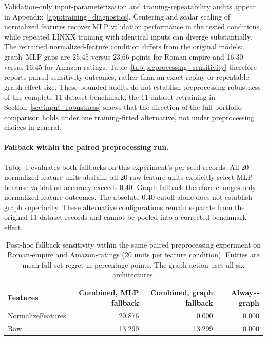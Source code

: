 Validation-only input-parameterization and training-repeatability audits appear in Appendix~\ref{app:training_diagnostics}. Centering and scalar scaling of normalized features recover MLP validation performance in the tested conditions, while repeated LINKX training with identical inputs can diverge substantially. The retrained normalized-feature condition differs from the original models: graph--MLP gaps are 25.45 versus 23.66 points for Roman-empire and 16.30 versus 16.45 for Amazon-ratings. Table~\ref{tab:preprocessing_sensitivity} therefore reports paired sensitivity outcomes, rather than an exact replay or repeatable graph effect size. These bounded audits do not establish preprocessing robustness of the complete 11-dataset benchmark; the 11-dataset retraining in Section~\ref{sec:input_robustness} shows that the direction of the full-portfolio comparison holds under one training-fitted alternative, not under preprocessing choices in general.

\paragraph{Fallback within the paired preprocessing run.}
Table~\ref{tab:preprocessing_fallback} evaluates both fallbacks on this experiment's per-seed records. All 20 normalized-feature units abstain; all 20 raw-feature units explicitly select MLP because validation accuracy exceeds 0.40. Graph fallback therefore changes only normalized-feature outcomes. The absolute 0.40 cutoff alone does not establish graph superiority. These alternative configurations remain separate from the original 11-dataset records and cannot be pooled into a corrected benchmark effect.

\begin{table}[ht]
\centering
\caption{Post-hoc fallback sensitivity within the same paired preprocessing experiment on Roman-empire and Amazon-ratings (20 units per feature condition). Entries are mean full-set regret in percentage points. The graph action uses all six architectures.}
\label{tab:preprocessing_fallback}
\small
\setlength{\tabcolsep}{3.5pt}
\begin{tabular}{@{}lrrr@{}}
\toprule
Features & Combined, MLP fallback & Combined, graph fallback & Always-graph \\
\midrule
NormalizeFeatures & 20.876 & 0.000 & 0.000 \\
Raw & 13.299 & 13.299 & 0.000 \\
\bottomrule
\end{tabular}
\end{table}


